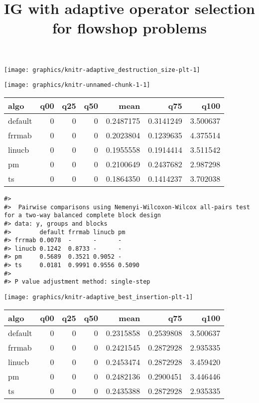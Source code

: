 \documentclass[
]{article}
\title{IG with adaptive operator selection for flowshop problems}
\author{}
\date{\vspace{-2.5em}}
\begin{document}
\maketitle

\begin{center}\texttt{[image: graphics/knitr-adaptive\_destruction\_size-plt-1]} \end{center}

\begin{center}\texttt{[image: graphics/knitr-unnamed-chunk-1-1]} \end{center}

\begin{tabular}{lrrrrrr}
\toprule
algo & q00 & q25 & q50 & mean & q75 & q100\\
\midrule
default & 0 & 0 & 0 & 0.2487175 & 0.3141249 & 3.500637\\
frrmab & 0 & 0 & 0 & 0.2023804 & 0.1239635 & 4.375514\\
linucb & 0 & 0 & 0 & 0.1955558 & 0.1914414 & 3.511542\\
pm & 0 & 0 & 0 & 0.2100649 & 0.2437682 & 2.987298\\
ts & 0 & 0 & 0 & 0.1864350 & 0.1414237 & 3.702038\\
\bottomrule
\end{tabular}

\begin{verbatim}
#> 
#>  Pairwise comparisons using Nemenyi-Wilcoxon-Wilcox all-pairs test for a two-way balanced complete block design
#> data: y, groups and blocks
#>        default frrmab linucb pm    
#> frrmab 0.0078  -      -      -     
#> linucb 0.1242  0.8733 -      -     
#> pm     0.5689  0.3521 0.9052 -     
#> ts     0.0181  0.9991 0.9556 0.5090
#> 
#> P value adjustment method: single-step
\end{verbatim}

\begin{center}\texttt{[image: graphics/knitr-adaptive\_best\_insertion-plt-1]} \end{center}

\begin{tabular}{lrrrrrr}
\toprule
algo & q00 & q25 & q50 & mean & q75 & q100\\
\midrule
default & 0 & 0 & 0 & 0.2315858 & 0.2539808 & 3.500637\\
frrmab & 0 & 0 & 0 & 0.2421545 & 0.2872928 & 2.935335\\
linucb & 0 & 0 & 0 & 0.2453474 & 0.2872928 & 3.459420\\
pm & 0 & 0 & 0 & 0.2482136 & 0.2900451 & 3.446446\\
ts & 0 & 0 & 0 & 0.2435388 & 0.2872928 & 2.935335\\
\bottomrule
\end{tabular}
\end{document}
